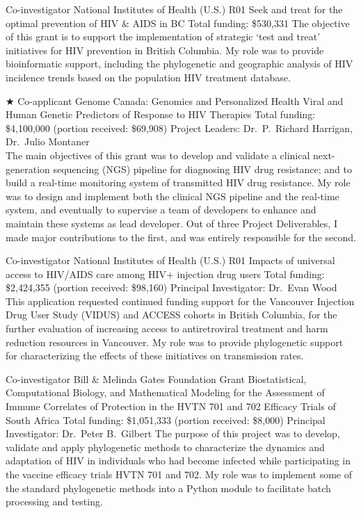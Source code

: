 {Co-investigator}
{National Institutes of Health (U.S.) R01}
{Seek and treat for the optimal prevention of HIV \& AIDS in BC}
{Total funding: \$530,331}
{
The objective of this grant is to support the implementation of strategic `test and treat' initiatives for HIV prevention in British Columbia.
My role was to provide bioinformatic support, including the phylogenetic and geographic analysis of HIV incidence trends based on the population HIV treatment database.\\
}



{$\bigstar$ Co-applicant}
{Genome Canada: Genomics and Personalized Health}
{Viral and Human Genetic Predictors of Response to HIV Therapies}
{Total funding: \$4,100,000 (portion received: \$69,908)}
{
Project Leaders: Dr.~P.~Richard Harrigan, Dr.~Julio Montaner\\
The main objectives of this grant was to develop and validate a clinical next-generation sequencing (NGS) pipeline for diagnosing HIV drug resistance;
and to build a real-time monitoring system of transmitted HIV drug resistance.
My role was to design and implement both the clinical NGS pipeline and the real-time system, and eventually to supervise a team of developers to enhance and maintain these systems as lead developer.
Out of three Project Deliverables, I made major contributions to the first, and was entirely responsible for the second.\\
}


{Co-investigator}
{National Institutes of Health (U.S.) R01}
{Impacts of universal access to HIV/AIDS care among HIV+ injection drug users}
{Total funding: \$2,424,355 (portion received: \$98,160)}
{
Principal Investigator: Dr.~Evan Wood\\
This application requested continued funding support for the Vancouver Injection Drug User Study (VIDUS) and ACCESS cohorts in British Columbia, for the further evaluation of increasing access to antiretroviral treatment and harm reduction resources in Vancouver.
My role was to provide phylogenetic support for characterizing the effects of these initiatives on transmission rates.\\
}


{Co-investigator}
{Bill \& Melinda Gates Foundation Grant}
{Biostatistical, Computational Biology, and Mathematical Modeling for the Assessment of
Immune Correlates of Protection in the HVTN 701 and 702 Efficacy Trials of South Africa}
{Total funding: \$1,051,333 (portion received: \$8,000)}
{
Principal Investigator: Dr.~Peter B.~Gilbert
The purpose of this project was to develop, validate and apply phylogenetic methods to characterize the dynamics and adaptation of HIV in individuals who had become infected while participating in the vaccine efficacy trials HVTN 701 and 702.
My role was to implement some of the standard phylogenetic methods into a Python module to facilitate batch processing and testing.\\
}


